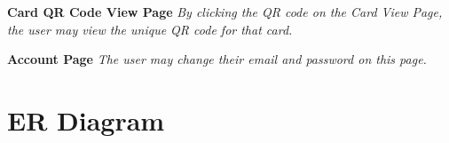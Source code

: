 \documentclass[12pt]{article}%
\begin{document}
\begin{center}
    \clearpage
    {\bf \Large Card QR Code View Page}
    {\it By clicking the QR code on the Card View Page, the user may view the unique QR code for that card.}
    
    \clearpage
    {\bf \Large Account Page}
    {\it The user may change their email and password on this page.}
    
\end{center}

\clearpage
\section{ER Diagram}
\end{document}
